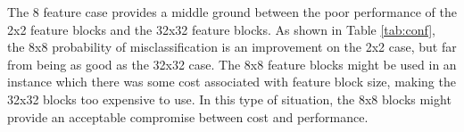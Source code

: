 The 8 feature case provides a middle ground between the poor performance of the 2x2 feature blocks and the 32x32 feature blocks.  As shown in Table \ref{tab:conf}, the 8x8 probability of misclassification is an improvement on the 2x2 case, but far from being as good as the 32x32 case.  The 8x8 feature blocks might be used in an instance which there was some cost associated with feature block size, making the 32x32 blocks too expensive to use.  In this type of situation, the 8x8 blocks might provide an acceptable compromise between cost and performance.  